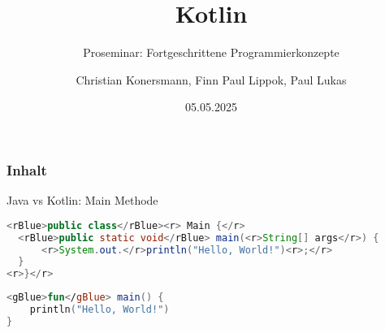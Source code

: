 \documentclass{beamer}
\title{Kotlin}
\subtitle{Proseminar: Fortgeschrittene Programmierkonzepte}
\author[C. Konersmann, F. P. Lippok, P. Lukas]{
  Christian Konersmann, Finn Paul Lippok, Paul Lukas
}
\date{05.05.2025}
\begin{document}
\frame{\titlepage}
\begin{frame}
  \frametitle{Inhalt}
  \tableofcontents
\end{frame}

\begin{frame}[fragile]{Java vs Kotlin: Main Methode}

\begin{lstlisting}[language=Java, xleftmargin=2em]
  <rBlue>public class</rBlue><r> Main {</r>
  <rBlue>public static void</rBlue> main(<r>String[] args</r>) {
      <r>System.out.</r>println("Hello, World!")<r>;</r>
  }
<r>}</r>
\end{lstlisting}

\begin{lstlisting}[language=Kotlin, xleftmargin=2em]
<gBlue>fun</gBlue> main() {
    println("Hello, World!")
}
\end{lstlisting}

\end{frame}
\end{document}
